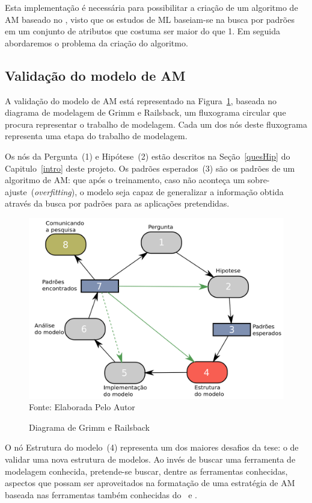 Esta implementação é necessária para possibilitar a criação de um algoritmo de AM baseado no \dmc, visto que os estudos de ML baseiam-se na busca por padrões em um conjunto de atributos que costuma ser maior do que 1. Em seguida abordaremos o problema da criação do algoritmo. 

\subsection{Validação do modelo de AM}
\label{ssec:vlalid}
A validação do modelo de AM está representado na Figura~\ref{fig:fluxoGrimm}, baseada no diagrama de modelagem de Grimm e Railsback, um fluxograma circular que procura representar o trabalho de modelagem. Cada um dos nós deste fluxograma representa uma etapa do trabalho de modelagem.

Os nós da Pergunta~(1) e Hipótese~(2) estão descritos na Seção~\ref{quesHip} do Capitulo~\ref{intro} deste projeto. Os padrões esperados~(3) são os padrões de um algoritmo de AM: que após o treinamento, caso não aconteça um sobre-ajuste~(\emph{overfitting}), o modelo seja capaz de generalizar a informação obtida através da busca por padrões para as aplicações pretendidas.

\begin{figure}[!htb]
	\centering
	\caption{Diagrama de Grimm e Railsback}
	\includegraphics[width=.8\textwidth]{../Figures/intro/Ciclo_Grimm.png}
	\\{\footnotesize Fonte: Elaborada Pelo Autor}
	\label{fig:fluxoGrimm}
\end{figure}


O nó Estrutura do modelo~(4) representa um dos maiores desafios da tese: o de validar uma nova estrutura de modelos. Ao invés de buscar uma ferramenta de modelagem conhecida, pretende-se buscar, dentre as ferramentas conhecidas, aspectos que possam ser aproveitados na formatação de uma estratégia de AM baseada nas ferramentas também conhecidas do \pdcca~e \dmc.

